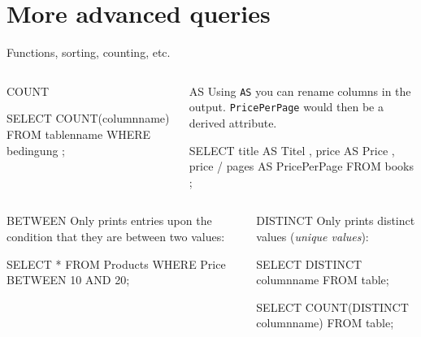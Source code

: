 \section{More advanced queries}
\begin{frame}{Functions, sorting, counting, etc.}

\begin{columns}
\begin{block}{COUNT}
  \begin{sqlcode}
SELECT COUNT(columnname) 
FROM tablenname 
WHERE bedingung ;
\end{sqlcode}
\end{block}

\begin{block}{AS}\small
Using \texttt{AS} you can rename columns in the output. \texttt{PricePerPage} would then be a derived attribute.\vspace{-1em}
\begin{sqlcode}
SELECT title AS Titel ,
price AS Price ,
price / pages AS PricePerPage
FROM books ;
\end{sqlcode}
\end{block}
\end{columns}

\framebreak

\begin{columns}
\begin{block}{BETWEEN}\small
Only prints entries upon the condition that they are between two values:\vspace{-1em}
  \begin{sqlcode}
SELECT * FROM Products
WHERE Price BETWEEN 10 AND 20; 
\end{sqlcode}
\end{block}


\begin{block}{DISTINCT}\small
Only prints distinct values (\emph{unique values}):\vspace{-1em}
  \begin{sqlcode}
SELECT DISTINCT columnname 
FROM table;

SELECT COUNT(DISTINCT columnname) 
FROM table;
\end{sqlcode}
\end{block}
\end{columns}



\end{frame}

